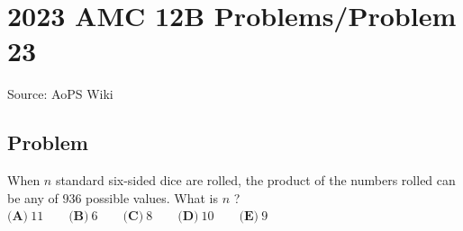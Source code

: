 \documentclass[12pt]{article}
\begin{document}
\section*{{2023 AMC 12B Problems/Problem 23}}
Source: AoPS Wiki

\subsection*{Problem}
When $n$ standard six-sided dice are rolled, the product of the numbers rolled can be any of $936$ possible values. What is $n$ ? $\textbf{(A)}~11\qquad\textbf{(B)}~6\qquad\textbf{(C)}~8\qquad\textbf{(D)}~10\qquad\textbf{(E)}~9$
\end{document}
